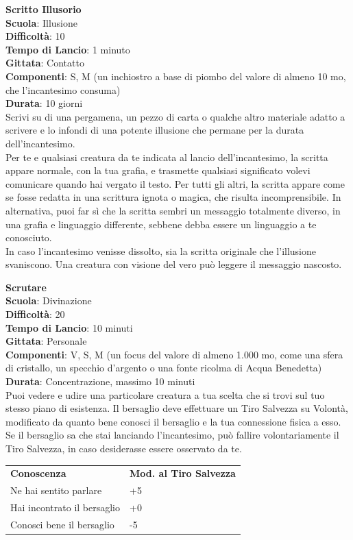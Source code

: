 \begin{multicols}{2}
\medskip\textbf{Scritto Illusorio}\\
\textbf{Scuola}: Illusione\\
\textbf{Difficoltà}: 10\\
\textbf{Tempo di Lancio}: 1 minuto\\
\textbf{Gittata}: Contatto\\
\textbf{Componenti}: S, M (un inchiostro a base di piombo del valore di almeno 10 mo, che l'incantesimo consuma)\\
\textbf{Durata}: 10 giorni\\
Scrivi su di una pergamena, un pezzo di carta o qualche altro materiale adatto a scrivere e lo infondi di una potente illusione che permane per la durata dell'incantesimo.\\
Per te e qualsiasi creatura da te indicata al lancio dell'incantesimo, la scritta appare normale, con la tua grafia, e trasmette qualsiasi significato volevi comunicare quando hai vergato il testo. Per tutti gli altri, la scritta appare come se fosse redatta in una scrittura ignota o magica, che risulta incomprensibile. In alternativa, puoi far sì che la scritta sembri un messaggio totalmente diverso, in una grafia e linguaggio differente, sebbene debba essere un linguaggio a te conosciuto.\\
In caso l'incantesimo venisse dissolto, sia la scritta originale che l'illusione svaniscono. Una creatura con visione del vero può leggere il messaggio nascosto.

\medskip\textbf{Scrutare}\\
\textbf{Scuola}: Divinazione\\
\textbf{Difficoltà}: 20\\
\textbf{Tempo di Lancio}: 10 minuti\\
\textbf{Gittata}: Personale\\
\textbf{Componenti}: V, S, M (un focus del valore di almeno 1.000 mo, come una sfera di cristallo, un specchio d'argento o una fonte ricolma di Acqua Benedetta)\\
\textbf{Durata}: Concentrazione, massimo 10 minuti\\
Puoi vedere e udire una particolare creatura a tua scelta che si trovi sul tuo stesso piano di esistenza. Il bersaglio deve effettuare un Tiro Salvezza su Volontà, modificato da quanto bene conosci il bersaglio e la tua connessione fisica a esso. Se il bersaglio sa che stai lanciando l'incantesimo, può fallire volontariamente il Tiro Salvezza, in caso desiderasse essere osservato da
te.
\medskip
\begin{tabular}{ll}
\toprule
\textbf{Conoscenza} & \textbf{Mod. al Tiro Salvezza}\\
Ne hai sentito parlare &+5\\
Hai incontrato il bersaglio &+0\\
Conosci bene il bersaglio &-5\\
\end{tabular}


\end{multicols}
